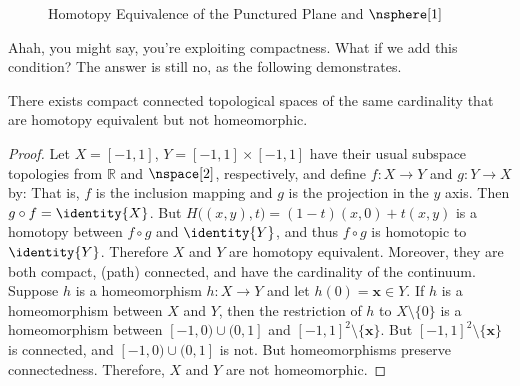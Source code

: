 \documentclass[oneside]{book}                                                  %
\begin{document}
                \begin{figure}[H]
                    \captionsetup{type=figure}
                    \centering
                    
                    \caption{%
                        Homotopy Equivalence of the Punctured Plane and
                        $\nsphere[1]$%
                    }
                    \label{fig:HE_punc_plane_and_circle}
                \end{figure}
                Ahah, you might say, you're exploiting compactness. What if we
                add this condition? The answer is still no, as the following
                demonstrates.
                \begin{theorem}
                    There exists compact connected topological spaces of the
                    same cardinality that are homotopy equivalent but not
                    homeomorphic.
                \end{theorem}
                \begin{proof}
                    Let $X=[\minus{1},1]$, $Y=[\minus{1},1]\times[\minus{1},1]$
                    have their usual subspace topologies from $\mathbb{R}$ and
                    $\nspace[2]$, respectively, and define $f:X\rightarrow{Y}$
                    and $g:Y\rightarrow{X}$ by:
                    That is, $f$ is the inclusion mapping and $g$ is the
                    projection in the $y$ axis. Then $g\circ{f}=\identity{X}$.
                    But $H\big((x,y),t\big)=(1-t)(x,0)+t(x,y)$ is a homotopy
                    between $f\circ{g}$ and $\identity{Y}$, and thus
                    $f\circ{g}$ is homotopic to $\identity{Y}$. Therefore $X$
                    and $Y$ are homotopy equivalent. Moreover, they are both
                    compact, (path) connected, and have the cardinality
                    of the continuum. Suppose $h$ is a homeomorphism
                    $h:X\rightarrow{Y}$ and let $h(0)=\mathbf{x}\in{Y}$. If $h$
                    is a homeomorphism between $X$ and $Y$, then the restriction
                    of $h$ to $X\setminus\{0\}$ is a homeomorphism between
                    $[-1,0)\cup(0,1]$ and $[-1,1]^{2}\setminus\{\mathbf{x}\}$.
                    But $[-1,1]^{2}\setminus\{\mathbf{x}\}$ is connected, and
                    $[-1,0)\cup(0,1]$ is not. But homeomorphisms preserve
                    connectedness. Therefore, $X$ and $Y$ are not homeomorphic.
                \end{proof}
\end{document}
